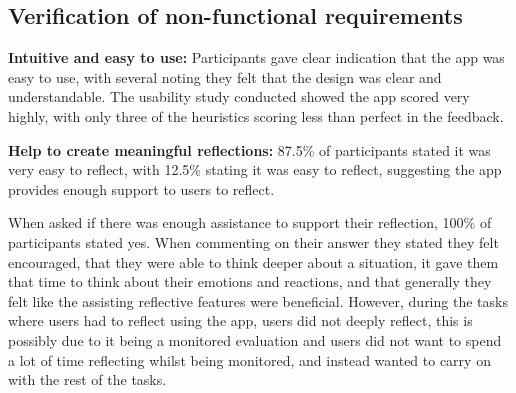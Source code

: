 \documentclass{l4proj}
\begin{document}
    

\subsection{Verification of non-functional requirements}

\textbf{Intuitive and easy to use:} Participants gave clear indication that the app was easy to use, with several noting they felt that the design was clear and understandable. The usability study conducted showed the app scored very highly, with only three of the heuristics scoring less than perfect in the feedback. 

\textbf{Help to create meaningful reflections:} 87.5\% of participants stated it was very easy to reflect, with 12.5\% stating it was easy to reflect, suggesting the app provides enough support to users to reflect. 

When asked if there was enough assistance to support their reflection, 100\% of participants stated yes. When commenting on their answer they stated they felt encouraged, that they were able to think deeper about a situation, it gave them that time to think about their emotions and reactions, and that generally they felt like the assisting reflective features were beneficial. However, during the tasks where users had to reflect using the app, users did not deeply reflect, this is possibly due to it being a monitored evaluation and users did not want to spend a lot of time reflecting whilst being monitored, and instead wanted to carry on with the rest of the tasks.
\end{document}
